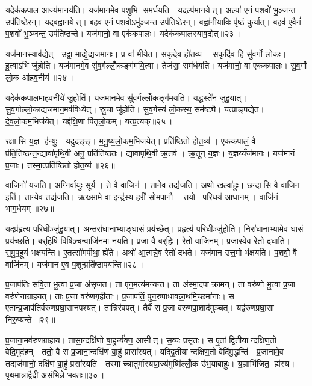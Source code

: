 यदेक॑कपाल॒ आज्य॑मा॒नय॑ति। यज॑मानमे॒व प॒शुभि॒ सम॑र्धयति। यदल्प॑मा॒नयेत्। अल्पा॑ एनं प॒शवो॑ भु॒ञ्जन्त॒ उप॑तिष्ठेरन्। यद्ब॒ह्वा॑नयेत्। ब॒हव॑ एनं प॒शवोऽभु॑ञ्जन्त॒ उप॑तिष्ठेरन्। ब॒ह्वा॑नीया॒विः पृ॑ष्ठं कुर्यात्। ब॒हव॑ ए॒वैनं॑ प॒शवो॑ भु॒ञ्जन्त॒ उप॑तिष्ठन्ते। यज॑मानो॒ वा एक॑कपालः। यदेक॑कपालस्याव॒द्येत्॥२३॥

यज॑मान॒स्याव॑द्येत्। उद्वा॒ माद्ये॒द्यज॑मानः। प्र वा॑ मीयेत। स॒कृदे॒व हो॑त॒व्य॑। स॒कृदि॑व॒ हि सु॑व॒र्गो लो॒कः। हु॒त्वाऽभि जु॑होति। यज॑मानमे॒व सु॑व॒र्गल्लोँ॒कङ्ग॑मयि॒त्वा। तेज॑सा॒ सम॑र्धयति। यज॑मानो॒ वा एक॑कपालः। सु॒व॒र्गो लो॒क आ॑हव॒नीय॑॥२४॥

यदेक॑कपालमाहव॒नीये॑ जु॒होति॑। यज॑मानमे॒व सु॑व॒र्गल्लोँ॒कङ्ग॑मयति। यद्धस्ते॑न जुहु॒यात्। सु॒व॒र्गाल्लो॒काद्यज॑मान॒मव॑विध्येत्। स्रु॒चा जु॑होति। सु॒व॒र्गस्य॑ लो॒कस्य॒ सम॑ष्ट्यै। यत्प्राङ्पद्ये॑त। दे॒व॒लो॒कम॒भिज॑येत्। यद्द॑क्षि॒णा पि॑तृलो॒कम्। यत्प्र॒त्यक्॥२५॥

रक्षासि य॒ज्ञ ह॑न्युः। यदुदङ्ङ्॑। म॒नु॒ष्य॒लो॒कम॒भिज॑येत्। प्रति॑ष्ठितो होत॒व्य॑। एक॑कपालं॒ वै प्र॑ति॒तिष्ठ॑न्त॒न्द्यावा॑पृथि॒वी अनु॒ प्रति॑तिष्ठतः। द्यावा॑पृथि॒वी ऋ॒तव॑। ऋ॒तून् य॒ज्ञः। य॒ज्ञय्यँज॑मानः। यज॑मानं प्र॒जाः। तस्मा॒त्प्रति॑ष्ठितो होत॒व्य॑॥२६॥

वा॒जिनो॑ यजति। अ॒ग्निर्वा॒युः सूर्य॑। ते वै वा॒जिन॑। ताने॒व तद्य॑जति। अथो॒ खल्वा॑हुः। छन्दासि॒ वै वा॒जिन॒ इति॑। तान्ये॒व तद्य॑जति। ऋ॒ख्सा॒मे वा इन्द्र॑स्य॒ हरी॑ सोम॒पानौ। तयो परि॒धय॑ आ॒धानम्। वाजि॑नं भाग॒धेयम्॥२७॥

यदप्र॑हृत्य परि॒धीञ्जु॑हु॒यात्। अ॒न्तरा॑धानाभ्याङ्घा॒सं प्रय॑च्छेत्। प्र॒हृत्य॑ परि॒धीञ्जु॑होति। निरा॑धानाभ्यामे॒व घा॒सं प्रय॑च्छति। ब॒र्॒हिषि॑ विषि॒ञ्चन्वाजि॑न॒मा न॑यति। प्र॒जा वै ब॒र्॒हिः। रेतो॒ वाजि॑नम्। प्र॒जास्वे॒व रेतो॑ दधाति। स॒मु॒प॒हूय॑ भक्षयन्ति। ए॒तत्सो॑मपीथा॒ ह्ये॑ते। अथो॑ आ॒त्मन्ने॒व रेतो॑ दधते। यज॑मान उत्त॒मो भ॑क्षयति। प॒शवो॒ वै वाजि॑नम्। यज॑मान ए॒व प॒शून्प्रति॑ष्ठापयन्ति॥२८॥\anuvakamend[लो॒को ब॑हुरू॒पं भ॑व॒त्याज्य॑भागौ प॒शव॒ आज्य॑मव॒द्येदा॑हव॒नीय॑ प्र॒त्यक्तस्मा॒त्प्रति॑ष्ठितो होत॒व्यो॑ भाग॒धेय॑मे॒ते च॒त्वारि॑ च]

प्र॒जाप॑तिः सवि॒ता भू॒त्वा प्र॒जा अ॑सृजत। ता ए॑न॒मत्य॑मन्यन्त। ता अ॑स्मा॒दपाक्रामन्। ता वरु॑णो भू॒त्वा प्र॒जा वरु॑णेनाग्राहयत्। ताः प्र॒जा वरु॑णगृहीताः। प्र॒जाप॑तिं॒ पुन॒रुपा॑धावन्ना॒थमि॒च्छमा॑नाः। स ए॒तान्प्र॒जाप॑तिर्वरुणप्रघा॒सान॑पश्यत्। तान्निर॑वपत्। तैर्वै स प्र॒जा व॑रुणपा॒शाद॑मुञ्चत्। यद्व॑रुणप्रघा॒सा नि॑रु॒प्यन्ते॥२९॥

प्र॒जाना॒मव॑रुणग्राहाय। तासा॒न्दक्षि॑णो बा॒हुर्न्य॑क्न॒ आसीत्। स॒व्यः प्रसृ॑तः। स ए॒तां द्वि॒तीयान्दक्षिण॒तो वेदि॒मुद॑हन्। ततो॒ वै स प्र॒जाना॒न्दक्षि॑णं बा॒हुं प्रासा॑रयत्। यद्द्वि॒तीयान्दक्षिण॒तो वेदि॑मु॒द्धन्ति॑। प्र॒जाना॑मे॒व तद्यज॑मानो॒ दक्षि॑णं बा॒हुं प्रसा॑रयति। तस्माच्चातुर्मास्यया॒ज्य॑मुष्मि॑ल्लोँ॒क उ॑भ॒याबा॑हुः। य॒ज्ञाभि॑जित॒ ह्य॑स्य। पृ॒थ॒मा॒त्राद्वैदी॒ असं॑भिन्ने भवतः॥३०॥

